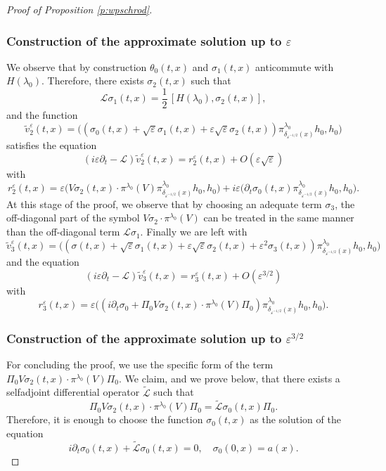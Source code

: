 \documentclass[JEP,XML,SOM,Unicode,published]{cedram}
\let\mathcal\mathscr
\theoremstyle{plain}
\theoremstyle{definition}
\let\eps\varepsilon
\begin{document}
\begin{proof}[Proof of Proposition \ref{p:wpschrod}]
\subsubsection*{Construction of the approximate solution up to $\eps$}
We observe that by construction $\theta_0(t,x)$ and $\sigma_1(t,x)$ anticommute with $H(\lambda_0)$. Therefore, there exists $\sigma_2(t,x)$ such that
\begin{equation}\label{def:sigma2}
\mathcal{L}\sigma_1(t,x) = \frac 12\, [H(\lambda_0), \sigma_2(t,x)],
\end{equation}
and the function
\[
\widetilde v^\eps_2(t,x)= \bigl((\sigma_0(t,x) +\sqrt\eps \sigma_1(t,x) +\eps\sqrt\eps\sigma_2(t,x))\pi^{\lambda_0}_{\delta_{\eps^{-1/2}}(x)}h_0,h_0\bigr)
\]
satisfies the equation
\[
(i\eps\partial_t-\mathcal{L})\widetilde v^\eps_2(t,x)= r^\eps_2(t,x)+O(\eps\sqrt\eps)
\]
with
\[
r^\eps_2(t,x) = \eps\bigl(V\sigma_2(t,x)\cdot \pi^{\lambda_0}(V)\pi^{\lambda_0}_{\delta_{\eps^{-1/2}}(x)}h_0,h_0\bigr)
+ i\eps \bigl(\partial_t \sigma_0 (t,x)\pi^{\lambda_0}_{\delta_{\eps^{-1/2}}(x)}h_0,h_0\bigr).
\]
At this stage of the proof, we observe that by choosing an adequate term $\sigma_3$, the off-diagonal part of the symbol $V\sigma_2\cdot \pi^{\lambda_0}(V)$ can be treated in the same manner than the off-diagonal term $\mathcal{L}\sigma_1$. Finally we are left with
\[
\widetilde v^\eps_3(t,x)= \bigl((\sigma(t,x) +\sqrt\eps \sigma_1(t,x) +\eps\sqrt\eps \sigma_2(t,x) +\eps^2 \sigma_3(t,x))\pi^{\lambda_0}_{\delta_{\eps^{-1/2}}(x)}h_0,h_0\bigr)
\]
and the equation
\[
(i\eps\partial_t-\mathcal{L})\widetilde v^\eps_3(t,x)= r^\eps_3(t,x) +O(\eps^{3/2})
\]
with
\[
r^\eps_3(t,x)= \eps\bigl((i\partial_t \sigma_0 + \Pi_0 V\sigma_2(t,x)\cdot \pi^{\lambda_0}(V) \Pi_0) \pi^{\lambda_0}_{\delta_{\eps^{-1/2}}(x)}h_0,h_0\bigr).
\]

\subsubsection*{Construction of the approximate solution up to $\eps^{3/2}$}
For concluding the proof, we use the specific form of the term $\Pi_0 V\sigma_2(t,x)\cdot \pi^{\lambda_0}(V) \Pi_0$. We claim, and we prove below, that there exists a selfadjoint differential operator $\widetilde{\mathcal{L}}$ such that
\begin{equation} \label{relation3}
\Pi_0 V\sigma_2(t,x)\cdot \pi^{\lambda_0}(V) \Pi_0=\widetilde{\mathcal{L}}\sigma_0(t,x)\Pi_0.
\end{equation}
Therefore, it is enough to choose the function $\sigma_0(t,x)$ as the solution of the equation
\begin{equation} \label{e:sigma0}
i\partial_t \sigma_0(t,x) + \widetilde{\mathcal{L}}\sigma_0(t,x)=0, \quad \sigma_0(0,x)=a(x).
\end{equation}


\end{proof}
\end{document}
